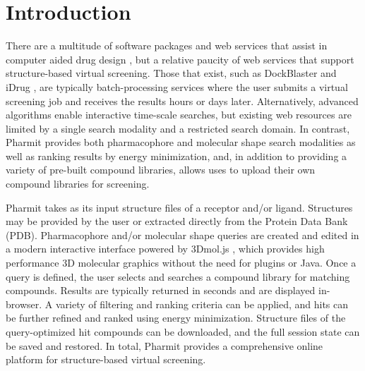 \section{Introduction}

There are a multitude of software packages and web services that assist in computer aided drug design \cite{Villoutreix_2013}, but a relative paucity of web services that support structure-based virtual screening.  Those that exist, such as DockBlaster \cite{Irwin_2009} and iDrug \cite{Wang_2014}, are typically batch-processing services where the user submits a virtual screening job and receives the results hours or days later.  Alternatively, advanced algorithms enable interactive time-scale searches, but existing web resources \cite{Koes_2012,Koes_2012z} are limited by a single search modality and a restricted search domain.  In contrast, Pharmit provides both pharmacophore and molecular shape search modalities as well as ranking results by energy minimization, and, in addition to providing a variety of pre-built compound libraries, allows uses to upload their own compound libraries for screening. 

Pharmit takes as its input structure files of a receptor and/or ligand. Structures may be provided by the user or extracted directly from the Protein Data Bank (PDB). 
Pharmacophore and/or molecular shape queries are created and edited in a modern interactive interface powered by 3Dmol.js \cite{Rego_2014}, which provides high performance 3D molecular graphics without the need for plugins or Java. Once a query is defined, the user selects and searches a compound library for matching compounds.  Results are typically returned in seconds and are displayed in-browser.  A variety of filtering and ranking criteria can be applied, and hits can be further refined and ranked using energy minimization. Structure files of the query-optimized hit compounds can be downloaded, and the full session state can be saved and restored.  In total, Pharmit provides a comprehensive online platform for structure-based virtual screening.





